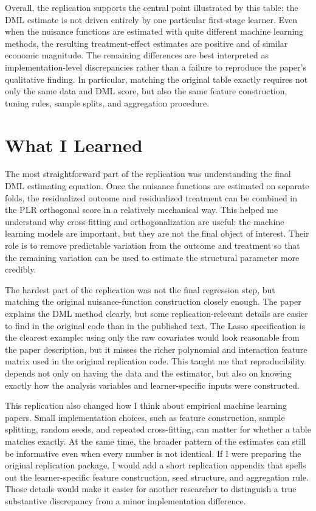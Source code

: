 \documentclass[12pt]{article}
\begin{document}
	Overall, the replication supports the central point illustrated by this table: the DML estimate is not driven entirely by one particular first-stage learner. Even when the nuisance functions are estimated with quite different machine learning methods, the resulting treatment-effect estimates are positive and of similar economic magnitude. The remaining differences are best interpreted as implementation-level discrepancies rather than a failure to reproduce the paper's qualitative finding. In particular, matching the original table exactly requires not only the same data and DML score, but also the same feature construction, tuning rules, sample splits, and aggregation procedure.
	
	\section{What I Learned}
	
	The most straightforward part of the replication was understanding the final DML estimating equation. Once the nuisance functions are estimated on separate folds, the residualized outcome and residualized treatment can be combined in the PLR orthogonal score in a relatively mechanical way. This helped me understand why cross-fitting and orthogonalization are useful: the machine learning models are important, but they are not the final object of interest. Their role is to remove predictable variation from the outcome and treatment so that the remaining variation can be used to estimate the structural parameter more credibly.
	
	The hardest part of the replication was not the final regression step, but matching the original nuisance-function construction closely enough. The paper explains the DML method clearly, but some replication-relevant details are easier to find in the original code than in the published text. The Lasso specification is the clearest example: using only the raw covariates would look reasonable from the paper description, but it misses the richer polynomial and interaction feature matrix used in the original replication code. This taught me that reproducibility depends not only on having the data and the estimator, but also on knowing exactly how the analysis variables and learner-specific inputs were constructed.
	
	This replication also changed how I think about empirical machine learning papers. Small implementation choices, such as feature construction, sample splitting, random seeds, and repeated cross-fitting, can matter for whether a table matches exactly. At the same time, the broader pattern of the estimates can still be informative even when every number is not identical. If I were preparing the original replication package, I would add a short replication appendix that spells out the learner-specific feature construction, seed structure, and aggregation rule. Those details would make it easier for another researcher to distinguish a true substantive discrepancy from a minor implementation difference.
	
	
	\newpage
	
	
	
\end{document}
